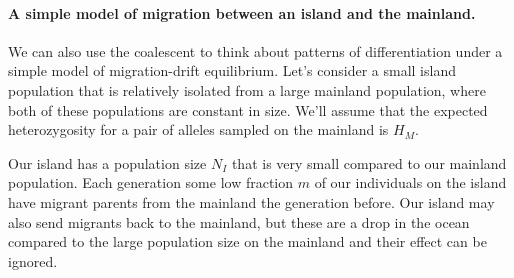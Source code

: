 
\paragraph{A simple model of migration between an island and the mainland.}
We can also use the coalescent to think about patterns of
differentiation under a simple model of migration-drift
equilibrium. Let's consider a small island population that is relatively isolated
from a large mainland population, where both of these populations
are constant in size. We'll assume that the expected heterozygosity
for a pair of alleles sampled on the mainland is $H_M$.

Our island has a population size
$N_{I}$ that is very small compared to our mainland population.
Each generation some low fraction $m$ of our individuals on the
island have migrant parents from the mainland the generation
before. Our island may also send migrants back to the mainland, but
these are a drop in the ocean compared to the large population size on
the mainland and their effect can be ignored. 


